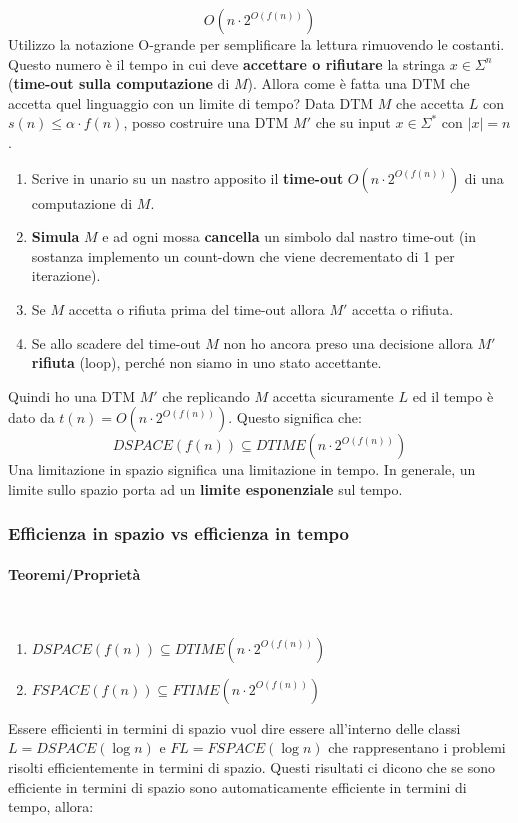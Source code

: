 \documentclass{article}
\begin{document}
$$O(n\cdot 2^{O(f(n))})$$
Utilizzo la notazione O-grande per semplificare la lettura rimuovendo le costanti. Questo numero è
il tempo in cui deve \textbf{accettare o rifiutare} la stringa $x\in\Sigma^n$
(\textbf{time-out sulla computazione} di $M$).
\newline\newline
Allora come è fatta una DTM che accetta quel linguaggio con un limite di tempo? Data DTM $M$ che accetta
$L$ con $s(n)\leq\alpha\cdot f(n)$, posso costruire una DTM $M'$ che su input $x\in\Sigma^*$ con $|x|=n$.
\begin{enumerate}
    \item Scrive in unario su un nastro apposito il \textbf{time-out} $O(n\cdot 2^{O(f(n))})$ di una computazione di $M$.
    \item \textbf{Simula} $M$ e ad ogni mossa \textbf{cancella} un simbolo dal nastro time-out (in
          sostanza implemento un count-down che viene decrementato di 1 per iterazione).
    \item Se $M$ accetta o rifiuta prima del time-out allora $M'$ accetta o rifiuta.
    \item Se allo scadere del time-out $M$ non ho ancora preso una decisione allora $M'$ \textbf{rifiuta} (loop),
          perché non siamo in uno stato accettante.
\end{enumerate}
Quindi ho una DTM $M'$ che replicando $M$ accetta sicuramente $L$ ed il tempo è
dato da $t(n)=O(n\cdot 2^{O(f(n))})$.
Questo significa che:
$$DSPACE(f(n))\subseteq DTIME(n\cdot 2^{O(f(n))})$$
Una limitazione in spazio significa una limitazione in tempo. In generale, un limite sullo spazio porta
ad un \textbf{limite esponenziale} sul tempo.

\subsubsection{Efficienza in spazio vs efficienza in tempo}
\paragraph{Teoremi/Proprietà}\mbox{}\\
\begin{enumerate}
    \item $DSPACE(f(n))\subseteq DTIME(n\cdot 2^{O(f(n))})$
    \item $FSPACE(f(n))\subseteq FTIME(n\cdot 2^{O(f(n))})$
\end{enumerate}
Essere efficienti in termini di spazio vuol dire essere all'interno delle classi
$L=DSPACE(\log n)$ e $FL=FSPACE(\log n)$ che
rappresentano i problemi risolti efficientemente in termini di spazio.
Questi risultati ci dicono che se sono efficiente in termini di spazio sono automaticamente
efficiente in termini di tempo, allora:
\end{document}

